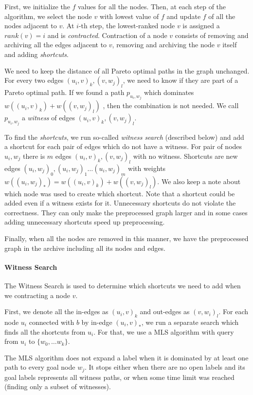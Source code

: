 First, we initialize the $f$ values for all the nodes. Then, at each step of
the algorithm, we select the node $v$ with lowest value of $f$ and update $f$
of all the nodes adjacent to $v$.  At $i$-th step, the lowest-ranked node $v$
is assigned a $rank(v) = i$ and is \emph{contracted}.  Contraction of a node
$v$ consists of removing and archiving all the edges adjacent to $v$, removing
and archiving the node $v$ itself and adding {\em shortcuts}. 

We need to keep the distance of all Pareto optimal paths in the graph
unchanged. For every two edges $(u_i,v)_k,(v,w_j)_l$, we need to know if they
are part of a Pareto optimal path. If we found a path $p_{u_i,w_j}$ which
dominates $w((u_i,v)_k)+w((v,w_j)_l)$ , then the combination is not needed. We
call $p_{u_i,w_j}$ a \emph{witness} of edges $(u_i,v)_k,(v,w_j)_l$. 

To find the {\em shortcuts}, we run so-called {\em witness search} (described
below) and add a shortcut for each pair of edges which do not have a witness.
For pair of nodes $u_i, w_j$ there is $m$ edges $(u_i,v)_k,(v,w_j)_l$
with no witness. Shortcuts are new edges
$(u_i,w_j)_0, (u_i,w_j)_1 \dots (u_i,w_j)_m$ 
with weights $w((u_i,w_j)_*) = w((u_i,v)_k)+w((v,w_j)_l)$.  We also keep a note
about which node was used to create which shortcut.  Note that a shortcut could
be added even if a witness exists for it. Unnecessary shortcuts do not violate
the correctness. They can only make the preprocessed graph larger and in some
cases adding unnecessary shortcuts speed up preprocessing. 


Finally, when all the nodes are removed in this manner, we have the
preprocessed graph in the archive including all its nodes and edges.

\paragraph*{Witness Search} The Witness Search is used to determine which
shortcuts we need to add when we contracting a node $v$. 

First, we denote all the in-edges as $(u_i,v)_k$ and out-edges as $(v,w_i)_l$.
For each node $u_i$ connected with $b$ by in-edge $(u_i,v)_*$, we run a
separate search which finds all the shortcuts from $u_i$. For that, we use a
MLS algorithm with query from $u_i$ to $\{w_0,\dots w_k\}$. 

The MLS algorithm does not expand a label when it is dominated by at least one
path to every goal node $w_j$. It stops either when there are no open labels
and its goal labels represents all witness paths, or when some time limit was reached
(finding only a subset of witnesses). 


